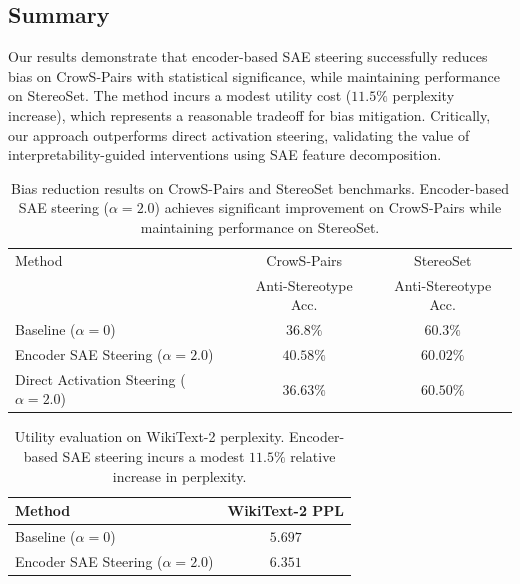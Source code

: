 \subsection{Summary}

Our results demonstrate that encoder-based SAE steering successfully reduces bias on CrowS-Pairs with statistical significance, while maintaining performance on StereoSet. The method incurs a modest utility cost ($11.5\%$ perplexity increase), which represents a reasonable tradeoff for bias mitigation. Critically, our approach outperforms direct activation steering, validating the value of interpretability-guided interventions using SAE feature decomposition.

\begin{table}[h]
\centering
\caption{Bias reduction results on CrowS-Pairs and StereoSet benchmarks. Encoder-based SAE steering ($\alpha=2.0$) achieves significant improvement on CrowS-Pairs while maintaining performance on StereoSet.}
\label{tab:bias_results}
\begin{tabular}{lcc}
\toprule
Method & CrowS-Pairs & StereoSet \\
 & Anti-Stereotype Acc. & Anti-Stereotype Acc. \\
\midrule
Baseline ($\alpha=0$) & $36.8\%$ & $60.3\%$ \\
Encoder SAE Steering ($\alpha=2.0$) & $\mathbf{40.58\%}$ & $60.02\%$ \\
Direct Activation Steering ($\alpha=2.0$) & $36.63\%$ & $60.50\%$ \\
\bottomrule
\end{tabular}
\end{table}

\begin{table}[h]
\centering
\caption{Utility evaluation on WikiText-2 perplexity. Encoder-based SAE steering incurs a modest $11.5\%$ relative increase in perplexity.}
\label{tab:utility_results}
\begin{tabular}{lc}
\toprule
Method & WikiText-2 PPL \\
\midrule
Baseline ($\alpha=0$) & $5.697$ \\
Encoder SAE Steering ($\alpha=2.0$) & $6.351$ \\
\bottomrule
\end{tabular}
\end{table}


